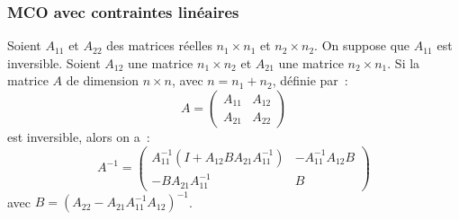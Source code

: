 \documentclass[10pt]{beamer}
\begin{document}
\begin{frame}
  \frametitle{MCO avec contraintes linéaires}

  \begin{prop}\label{prop:inversion}
    Soient $A_{11}$ et $A_{22}$ des matrices réelles $n_1\times n_1$ et $n_2\times n_2$. On suppose que $A_{11}$ est inversible. Soient $A_{12}$ une matrice $n_1\times n_2$ et $A_{21}$ une matrice $n_2\times n_1$. Si la matrice $A$ de dimension $n\times n$, avec $n = n_1+n_2$, définie par~:
    \[
      A =
      \begin{pmatrix}
        A_{11} & A_{12}\\
        A_{21} & A_{22}
      \end{pmatrix}
    \]
    est inversible, alors on a~:
    \[
      A^{-1} =
      \begin{pmatrix}
        A_{11}^{-1}\left( I + A_{12}BA_{21}A_{11}^{-1} \right) & -A_{11}^{-1}A_{12}B \\
        -BA_{21}A_{11}^{-1} & B
      \end{pmatrix}
    \]
    avec $B = \left(A_{22}-A_{21}A_{11}^{-1}A_{12}\right)^{-1}$.
  \end{prop}

\end{frame}
\end{document}
